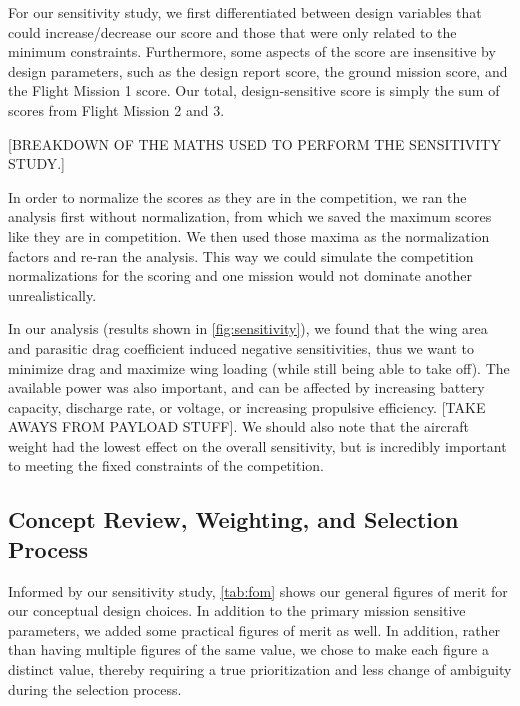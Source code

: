 \documentclass[report]{byu-aero}
\begin{document}
For our sensitivity study, we first differentiated between design variables that could increase/decrease our score and those that were only related to the minimum constraints. Furthermore, some aspects of the score are insensitive by design parameters, such as the design report score, the ground mission score, and the Flight Mission 1 score.  Our total, design-sensitive score is simply the sum of scores from Flight Mission 2 and 3.

{\color{\BYUred} [BREAKDOWN OF THE MATHS USED TO PERFORM THE SENSITIVITY STUDY.]}

In order to normalize the scores as they are in the competition, we ran the analysis first without normalization, from which we saved the maximum scores like they are in competition. We then used those maxima as the normalization factors and re-ran the analysis. This way we could simulate the competition normalizations for the scoring and one mission would not dominate another unrealistically.

In our analysis (results shown in \cref{fig:sensitivity}), we found that the wing area and parasitic drag coefficient induced negative sensitivities, thus we want to minimize drag and maximize wing loading (while still being able to take off).  The available power was also important, and can be affected by increasing battery capacity, discharge rate, or voltage, or increasing propulsive efficiency. {\color{BYUred}[TAKE AWAYS FROM PAYLOAD STUFF]}. We should also note that the aircraft weight had the lowest effect on the overall sensitivity, but is incredibly important to meeting the fixed constraints of the competition.




\subsection{Concept Review, Weighting, and Selection Process}
\label{ssec:selectionprocess}

Informed by our sensitivity study, \cref{tab:fom} shows our general figures of merit for our conceptual design choices. In addition to the primary mission sensitive parameters, we added some practical figures of merit as well.  In addition, rather than having multiple figures of the same value, we chose to make each figure a distinct value, thereby requiring a true prioritization and less change of ambiguity during the selection process.
\end{document}
